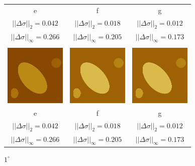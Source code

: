 \documentclass{procDDs}
\begin{document}
\begin{figure}[h!]
\begin{tabular}{ccc}
		\\
		e & f & g 
		\\
		$||\Delta\sigma||_2 = 0.042$ & 
		$||\Delta\sigma||_2 = 0.018$ &  
		$||\Delta\sigma||_2 = 0.012$  
		\\
		$||\Delta\sigma||_\infty = 0.266$ & 
		$||\Delta\sigma||_\infty = 0.205$ &  
		$||\Delta\sigma||_\infty = 0.173$
		\\ \\
		\includegraphics[width=0.2\linewidth]{img/5/8.jpg}
		&
		\includegraphics[width=0.2\linewidth]{img/5/9.jpg}
		&
		\includegraphics[width=0.2\linewidth]{img/5/9.jpg}
		\\
		e & f & g 
		\\
		$||\Delta\sigma||_2 = 0.042$ & 
		$||\Delta\sigma||_2 = 0.018$ &  
		$||\Delta\sigma||_2 = 0.012$  
		\\
		$||\Delta\sigma||_\infty = 0.266$ & 
		$||\Delta\sigma||_\infty = 0.205$ &  
		$||\Delta\sigma||_\infty = 0.173$		
	\end{tabular}
	\caption{$1^\circ$}
	\label{ris:desc1}
\end{figure}
\end{document}
